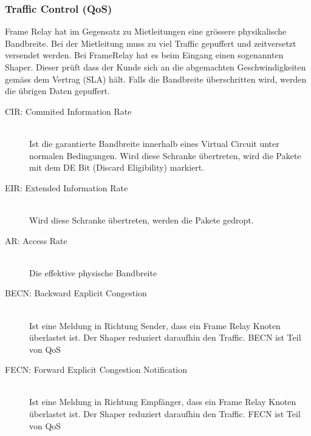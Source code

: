 \subsubsection{Traffic Control (QoS)}
Frame Relay hat im Gegensatz zu Mietleitungen eine grössere physikalische Bandbreite. Bei der Mietleitung muss zu viel Traffic gepuffert und zeitversetzt versendet werden. Bei FrameRelay hat es beim Eingang einen sogenannten Shaper. Dieser prüft dass der Kunde sich an die abgemachten Geschwindigkeiten gemäss dem Vertrag (SLA) hält. Falls die Bandbreite überschritten wird, werden die übrigen Daten gepuffert.
\begin{description}
	\item[CIR: Commited Information Rate] \hfill \\
	Ist die garantierte Bandbreite innerhalb eines Virtual Circuit unter normalen Bedingungen. Wird diese Schranke übertreten, wird die Pakete mit dem DE Bit (Discard Eligibility) markiert.
	\item[EIR: Extended Information Rate] \hfill \\
	Wird diese Schranke übertreten, werden die Pakete gedropt.
	\item[AR: Access Rate] \hfill \\
	Die effektive physische Bandbreite
	\item[BECN: Backward Explicit Congestion] \hfill \\ Ist eine Meldung in Richtung Sender, dass ein Frame Relay Knoten überlastet ist. Der Shaper reduziert daraufhin den Traffic. BECN ist Teil von QoS
	\item[FECN: Forward Explicit Congestion Notification]\hfill \\ Ist eine Meldung in Richtung Empfänger, dass ein Frame Relay Knoten überlastet ist. Der Shaper reduziert daraufhin den Traffic. FECN ist Teil von QoS
\end{description}

